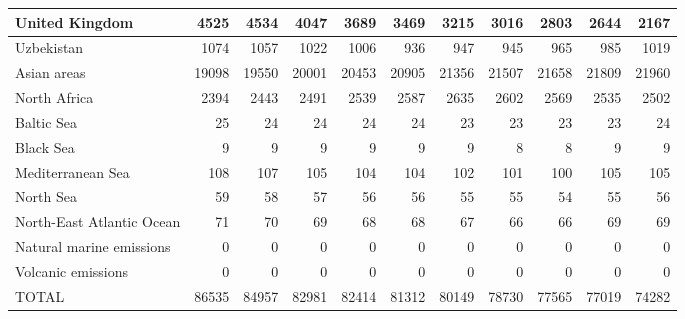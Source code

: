 \begin{table}
\begin{tabular}{|l|r|r|r|r|r|r|r|r|r|r|}
                United Kingdom&   4525&   4534&   4047&   3689&   3469&   3215&   3016&   2803&   2644&   2167\\\hline
                    Uzbekistan&   1074&   1057&   1022&   1006&    936&    947&    945&    965&    985&   1019\\\hline
                   Asian areas&  19098&  19550&  20001&  20453&  20905&  21356&  21507&  21658&  21809&  21960\\\hline
                  North Africa&   2394&   2443&   2491&   2539&   2587&   2635&   2602&   2569&   2535&   2502\\\hline
                    Baltic Sea&     25&     24&     24&     24&     24&     23&     23&     23&     23&     24\\\hline
                     Black Sea&      9&      9&      9&      9&      9&      9&      8&      8&      9&      9\\\hline
             Mediterranean Sea&    108&    107&    105&    104&    104&    102&    101&    100&    105&    105\\\hline
                     North Sea&     59&     58&     57&     56&     56&     55&     55&     54&     55&     56\\\hline
     North-East Atlantic Ocean&     71&     70&     69&     68&     68&     67&     66&     66&     69&     69\\\hline
      Natural marine emissions&      0&      0&      0&      0&      0&      0&      0&      0&      0&      0\\\hline
            Volcanic emissions&      0&      0&      0&      0&      0&      0&      0&      0&      0&      0\\\hline\hline
                         TOTAL&  86535&  84957&  82981&  82414&  81312&  80149&  78730&  77565&  77019&  74282\\\hline
 \end{tabular}
 \end{table}
 
